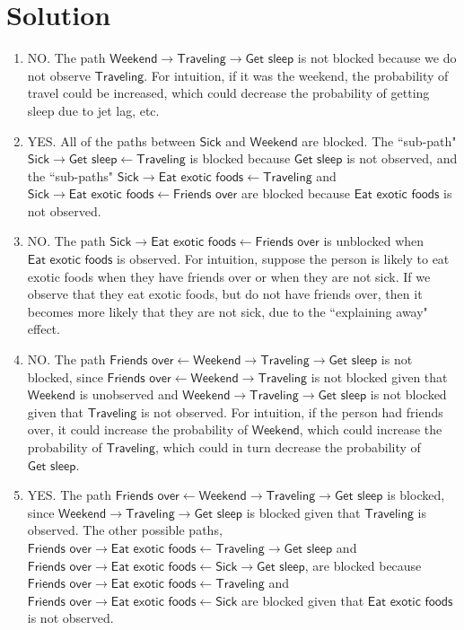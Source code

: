 \documentclass[submit]{harvardml}
\newcommand{\attr}[1]{\textsf{#1}}
\begin{document}
\newpage
\section*{Solution}
\begin{enumerate}
  \item NO. The path $\attr{Weekend} \rightarrow \attr{Traveling} \rightarrow \attr{Get sleep}$ is not blocked because we do not observe $\attr{Traveling}$. For intuition, if it was the weekend, the probability of travel could be increased, which could decrease the probability of getting sleep due to jet lag, etc.
  \item YES. All of the paths between $\attr{Sick}$ and $\attr{Weekend}$ are blocked. The ``sub-path" $\attr{Sick} \rightarrow \attr{Get sleep} \leftarrow \attr{Traveling}$ is blocked because $\attr{Get sleep}$ is not observed, and the ``sub-paths" $\attr{Sick} \rightarrow \attr{Eat exotic foods} \leftarrow \attr{Traveling}$ and $\attr{Sick} \rightarrow \attr{Eat exotic foods} \leftarrow \attr{Friends over}$ are blocked because $\attr{Eat exotic foods}$ is not observed.
  \item NO. The path $\attr{Sick} \rightarrow \attr{Eat exotic foods} \leftarrow \attr{Friends over}$ is unblocked when $\attr{Eat exotic foods}$ is observed.
  For intuition, suppose the person is likely to eat exotic foods when they have friends over or when they are not sick. If we observe that they eat exotic foods, but do not have friends over, then it becomes more likely that they are not sick, due to the ``explaining away" effect.

  \item NO. The path $\attr{Friends over} \leftarrow \attr{Weekend} \rightarrow \attr{Traveling} \rightarrow \attr{Get sleep}$ is not blocked, since $\attr{Friends over} \leftarrow \attr{Weekend} \rightarrow \attr{Traveling}$ is not blocked given that $\attr{Weekend}$ is unobserved and $\attr{Weekend} \rightarrow \attr{Traveling} \rightarrow \attr{Get sleep}$ is not blocked given that $\attr{Traveling}$ is not observed. For intuition, if the person had friends over, it could increase the probability of $\attr{Weekend}$, which could increase the probability of $\attr{Traveling}$, which could in turn decrease the probability of $\attr{Get sleep}$.
  
  \item YES. The path $\attr{Friends over} \leftarrow \attr{Weekend} \rightarrow \attr{Traveling} \rightarrow \attr{Get sleep}$ is blocked, since $\attr{Weekend} \rightarrow \attr{Traveling} \rightarrow \attr{Get sleep}$ is blocked given that $\attr{Traveling}$ is observed. The other possible paths, $\attr{Friends over} \rightarrow \attr{Eat exotic foods} \leftarrow \attr{Traveling} \rightarrow \attr{Get sleep}$ and $\attr{Friends over} \rightarrow \attr{Eat exotic foods} \leftarrow \attr{Sick} \rightarrow \attr{Get sleep}$, are blocked because $\attr{Friends over} \rightarrow \attr{Eat exotic foods} \leftarrow \attr{Traveling}$ and $\attr{Friends over} \rightarrow \attr{Eat exotic foods} \leftarrow \attr{Sick}$ are blocked given that $\attr{Eat exotic foods}$ is not observed.
  

\end{enumerate}
\end{document}
